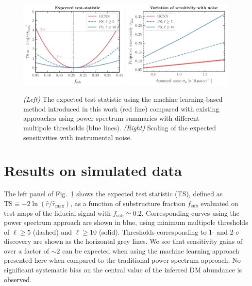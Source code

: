 \documentclass[]{article}
\begin{document}
\begin{figure}[!htbp]
\centering
\includegraphics[width=0.49\textwidth]{figures/TS}
\includegraphics[width=0.49\textwidth]{figures/noise_var}
\caption{\emph{(Left)} The expected test statistic using the machine learning-based method introduced in this work (red line) compared with existing approaches using power spectrum summaries with different multipole thresholds (blue lines). \emph{(Right)} Scaling of the expected sensitivities with instrumental noise.}
\label{fig:experiment}
\end{figure}
 

\section{Results on simulated data}
\label{sec:experiments}

The left panel of Fig.~\ref{fig:experiment} shows the expected test statistic (TS), defined as $\mathrm{TS} \equiv -2\ln(\hat r / \hat r_\mathrm{max})$, as a function of substructure fraction $f_\mathrm{sub}$ evaluated on test maps of the fiducial signal with $f_\mathrm{sub} \simeq 0.2$. Corresponding curves using the power spectrum approach are shown in blue, using minimum multipole thresholds of $\ell \geq 5$ (dashed) and $\ell \geq 10$ (solid). Thresholds corresponding to 1- and 2-$\sigma$ discovery are shown as the horizontal grey lines. We see that sensitivity gains of over a factor of $\sim 2$ can be expected when using the machine learning approach presented here when compared to the traditional power spectrum approach. No significant systematic bias on the central value of the inferred DM abundance is observed.
\end{document}

